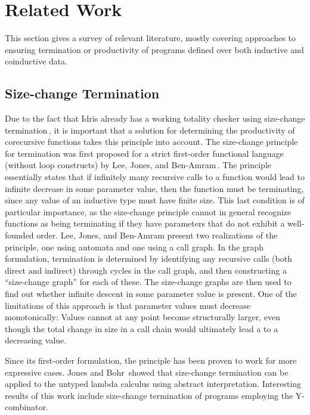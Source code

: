 \section{Related Work}
\label{sec:related_work}
This section gives a survey of relevant literature, mostly covering approaches to ensuring termination or productivity of programs defined over both inductive and coinductive data.

\subsection{Size-change Termination}
Due to the fact that Idris already has a working totality checker using size-change termination\,\citep{BradyIdrisImpl13}, it is important that a solution for determining the productivity of corecursive functions takes this principle into account. The size-change principle for termination was first proposed for a strict first-order functional language (without loop constructs) by Lee, Jones, and Ben-Amram\,\citep{LeeJones01SizeChange}. The principle essentially states that if infinitely many recursive calls to a function would lead to infinite decrease in some parameter value, then the function must be terminating, since any value of an inductive type must have finite size. This last condition is of particular importance, as the size-change principle cannot in general recognize functions as being terminating if they have parameters that do not exhibit a well-founded order. Lee, Jones, and Ben-Amram present two realizations of the principle, one using automata and one using a call graph. In the graph formulation, termination is determined by identifying any recursive calls (both direct and indirect) through cycles in the call graph, and then constructing a ``size-change graph'' for each of these. The size-change graphs are then used to find out whether infinite descent in some parameter value is present. One of the limitations of this approach is that parameter values must decrease monotonically: Values cannot at any point become structurally larger, even though the total change in size in a call chain would ultimately lead a to a decreasing value.

Since its first-order formulation, the principle has been proven to work for more expressive cases. Jones and Bohr\,\citep{Jones04Untyped} showed that size-change termination can be applied to the untyped lambda calculus using abstract interpretation. Interesting results of this work include size-change termination of programs employing the Y-combinator.

